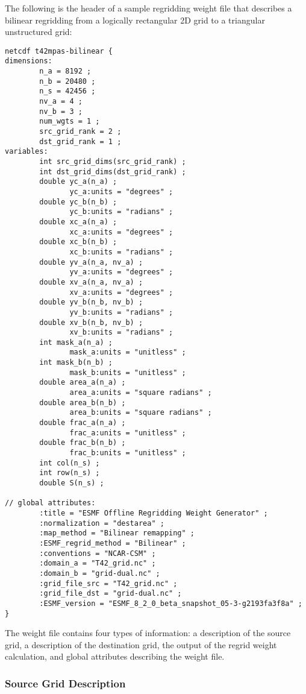 The following is the header of a sample regridding weight file that describes a bilinear regridding 
from a logically rectangular 2D grid to a triangular unstructured grid:

\begin{verbatim}
netcdf t42mpas-bilinear {
dimensions:
        n_a = 8192 ;
        n_b = 20480 ;
        n_s = 42456 ;
        nv_a = 4 ;
        nv_b = 3 ;
        num_wgts = 1 ;
        src_grid_rank = 2 ;
        dst_grid_rank = 1 ;
variables:
        int src_grid_dims(src_grid_rank) ;
        int dst_grid_dims(dst_grid_rank) ;
        double yc_a(n_a) ;
               yc_a:units = "degrees" ;
        double yc_b(n_b) ;
               yc_b:units = "radians" ;
        double xc_a(n_a) ;
               xc_a:units = "degrees" ;
        double xc_b(n_b) ;
               xc_b:units = "radians" ;
        double yv_a(n_a, nv_a) ;
               yv_a:units = "degrees" ;
        double xv_a(n_a, nv_a) ;
               xv_a:units = "degrees" ;
        double yv_b(n_b, nv_b) ;
               yv_b:units = "radians" ;
        double xv_b(n_b, nv_b) ;
               xv_b:units = "radians" ;
        int mask_a(n_a) ;
               mask_a:units = "unitless" ;
        int mask_b(n_b) ;
               mask_b:units = "unitless" ;
        double area_a(n_a) ;
               area_a:units = "square radians" ;
        double area_b(n_b) ;
               area_b:units = "square radians" ;
        double frac_a(n_a) ;
               frac_a:units = "unitless" ;
        double frac_b(n_b) ;
               frac_b:units = "unitless" ;
        int col(n_s) ;
        int row(n_s) ;
        double S(n_s) ;
 
// global attributes:
        :title = "ESMF Offline Regridding Weight Generator" ;
        :normalization = "destarea" ;
        :map_method = "Bilinear remapping" ;
        :ESMF_regrid_method = "Bilinear" ;
        :conventions = "NCAR-CSM" ;
        :domain_a = "T42_grid.nc" ;
        :domain_b = "grid-dual.nc" ;
        :grid_file_src = "T42_grid.nc" ;
        :grid_file_dst = "grid-dual.nc" ;
        :ESMF_version = "ESMF_8_2_0_beta_snapshot_05-3-g2193fa3f8a" ;
}
\end{verbatim}

 The weight file contains four types of information: a description of the source grid, a description of the destination grid, the output of the regrid weight calculation, and global attributes describing the weight file. 

\subsubsection{Source Grid Description}

